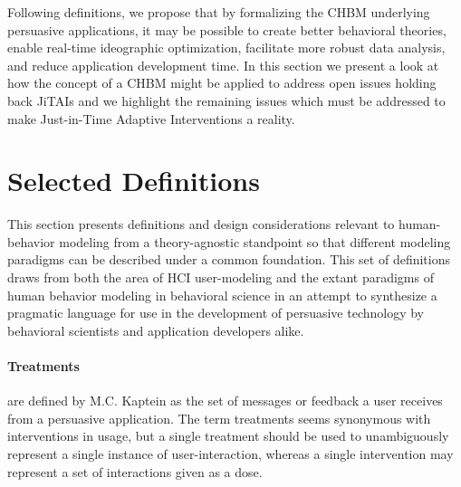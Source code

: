 \documentclass[runningheads,a4paper]{llncs}
\begin{document}
Following definitions, we propose that by formalizing the CHBM underlying persuasive applications, it may be possible to create better behavioral theories, enable real-time ideographic optimization, facilitate more robust data analysis, and reduce application development time. 
In this section we present a look at how the concept of a CHBM might be applied to address open issues holding back JiTAIs and we highlight the remaining issues which must be addressed to make Just-in-Time Adaptive Interventions a reality.

\section{Selected Definitions}

This section presents definitions and design considerations relevant to human-behavior modeling from a theory-agnostic standpoint so that different modeling paradigms can be described under a common foundation.
This set of definitions draws from both the area of HCI user-modeling and the extant paradigms of human behavior modeling in behavioral science in an attempt to synthesize a pragmatic language for use in the development of persuasive technology by behavioral scientists and application developers alike.

\paragraph{Treatments} are defined by M.C. Kaptein \cite{kaptein2015formalizing} as the set of messages or feedback a user receives from a persuasive application. 
The term treatments seems synonymous with interventions in usage, but a single treatment should be used to unambiguously represent a single instance of user-interaction, whereas a single intervention may represent a set of interactions given as a dose.
\end{document}
